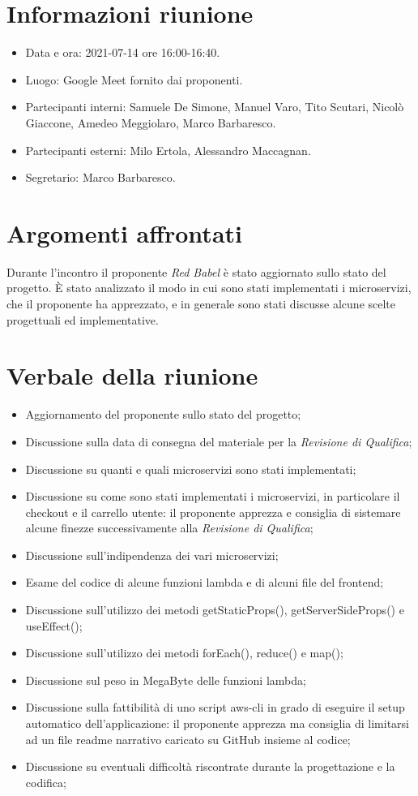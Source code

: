 \documentclass[a4paper]{article}
\begin{document}
\newpage
\tableofcontents
\newpage

\section{Informazioni riunione}
\begin{itemize}
    \item Data e ora: 2021-07-14 ore 16:00-16:40.
    \item Luogo: Google Meet fornito dai proponenti.
    \item Partecipanti interni: Samuele De Simone, Manuel Varo, Tito Scutari, Nicolò Giaccone, Amedeo Meggiolaro, Marco Barbaresco.
    \item Partecipanti esterni: Milo Ertola, Alessandro Maccagnan.
    \item Segretario: Marco Barbaresco.
\end{itemize}
\section{Argomenti affrontati}
Durante l'incontro il proponente \textit{Red Babel} è stato aggiornato sullo stato del progetto. È stato analizzato il modo in cui sono stati
implementati i microservizi, che il proponente ha apprezzato, e in generale sono stati discusse alcune scelte progettuali ed implementative.
\section{Verbale della riunione}
\begin{itemize}
    \item Aggiornamento del proponente sullo stato del progetto;
    \item Discussione sulla data di consegna del materiale per la \textit{Revisione di Qualifica};
    \item Discussione su quanti e quali microservizi sono stati implementati;
    \item Discussione su come sono stati implementati i microservizi, in particolare il checkout e il carrello utente: il proponente apprezza e consiglia di sistemare
          alcune finezze successivamente alla \textit{Revisione di Qualifica};
    \item Discussione sull'indipendenza dei vari microservizi;
    \item Esame del codice di alcune funzioni lambda e di alcuni file del frontend;
    \item Discussione sull'utilizzo dei metodi getStaticProps(), getServerSideProps() e useEffect();
    \item Discussione sull'utilizzo dei metodi forEach(), reduce() e map();
    \item Discussione sul peso in MegaByte delle funzioni lambda;
    \item Discussione sulla fattibilità di uno script aws-cli in grado di eseguire il setup automatico dell'applicazione: il proponente apprezza ma consiglia di limitarsi ad un
          file readme narrativo caricato su GitHub insieme al codice;
    \item Discussione su eventuali difficoltà riscontrate durante la progettazione e la codifica;
\end{itemize}
\newpage
\end{document}
